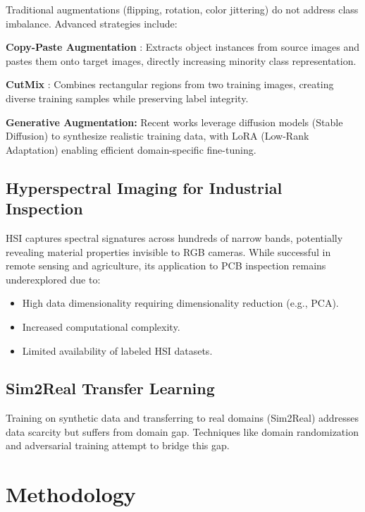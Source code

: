 \documentclass[12pt,a4paper]{article}
\begin{document}
Traditional augmentations (flipping, rotation, color jittering) do not address class imbalance. Advanced strategies include:

\textbf{Copy-Paste Augmentation} \cite{ghiasi2021copypaste}: Extracts object instances from source images and pastes them onto target images, directly increasing minority class representation.

\textbf{CutMix} \cite{yun2019cutmix}: Combines rectangular regions from two training images, creating diverse training samples while preserving label integrity.

\textbf{Generative Augmentation:} Recent works leverage diffusion models (Stable Diffusion) to synthesize realistic training data, with LoRA (Low-Rank Adaptation) enabling efficient domain-specific fine-tuning.

\subsection{Hyperspectral Imaging for Industrial Inspection}

HSI captures spectral signatures across hundreds of narrow bands, potentially revealing material properties invisible to RGB cameras. While successful in remote sensing and agriculture, its application to PCB inspection remains underexplored due to:
\begin{itemize}
    \item High data dimensionality requiring dimensionality reduction (e.g., PCA).
    \item Increased computational complexity.
    \item Limited availability of labeled HSI datasets.
\end{itemize}

\subsection{Sim2Real Transfer Learning}

Training on synthetic data and transferring to real domains (Sim2Real) addresses data scarcity but suffers from domain gap. Techniques like domain randomization and adversarial training attempt to bridge this gap.

\section{Methodology}
\end{document}
